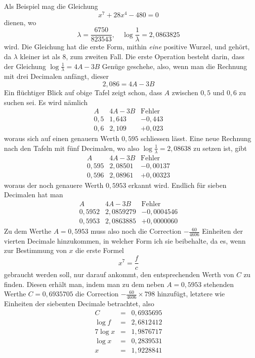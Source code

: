 Als Beispiel mag die Gleichung
\[
x^7+28x^4-480=0
\]
dienen, wo
\[
\lambda=\frac{6750}{823543},\quad \log\frac{1}{\lambda}=2{,}0863825
\]
wird. Die Gleichung hat die erste Form, mithin \textit{eine} positive Wurzel, und gehört, da $\lambda$ kleiner ist als $8$, zum zweiten Fall. Die erste Operation besteht darin,
dass der Gleichung $\log\frac{1}{\lambda}=4A-3B$ Genüge geschehe, also, wenn man die
Rechnung mit drei Decimalen anfängt, dieser
\[
2{,}086=4A-3B
\]
Ein flüchtiger Blick auf obige Tafel zeigt schon, dass $A$ zwischen $0{,}5$ und $0{,}6$
zu suchen sei. Es wird nämlich
\[
\begin{array}{c|c|c}
A&4A-3B&\mbox{Fehler}\\\hline
0{,}5&1{,}643&-0{,}443\\
0{,}6&2{,}109&+0{,}023
\end{array}
\]
woraus sich auf einen genauern Werth $0{,}595$ schliessen lässt. Eine neue Rechnung nach den Tafeln mit fünf Decimalen, wo also $\log\frac{1}{\lambda}=2{,}08638$ zu setzen
ist, gibt
\[
\begin{array}{c|c|c}
A&4A-3B&\mbox{Fehler}\\\hline
0{,}595&2{,}08501&-0{,}00137\\
0{,}596&2{,}08961&+0{,}00323
\end{array}
\]
woraus der noch genauere Werth $0{,}5953$ erkannt wird. Endlich für sieben Decimalen hat man
\[
\begin{array}{c|c|c}
A&4A-3B&\mbox{Fehler}\\\hline
0{,}5952&2{,}0859279&-0{,}0004546\\
0{,}5953&2{,}0863885&+0{,}0000060
\end{array}
\]
Zu dem Werthe $A=0{,}5953$ muss also noch die Correction $-\frac{60}{4606}$ Einheiten
der vierten Decimale hinzukommen, in welcher Form ich sie beibehalte, da es,
wenn zur Bestimmung von $x$ die erste Formel
\[
x^{7}=\frac{f}{c}
\]
gebraucht werden soll, nur darauf ankommt, den entsprechenden Werth von $C$
zu finden. Diesen erhält man, indem man zu dem neben $A=0{,}5953$ stehenden Werthe $C=0{,}6935705$ die Correction $-\frac{60}{4606}\times798$ hinzufügt, letztere
wie Einheiten der siebenten Decimale betrachtet, also
\[
\begin{array}{rcl}
C&=&0{,}6935695\\
\log f&=&2{,}6812412\\ \hline
7\log x&=&1{,}9876717\\
\log x&=&0{,}2839531\\
x&=&1{,}9228841
\end{array}
\]

